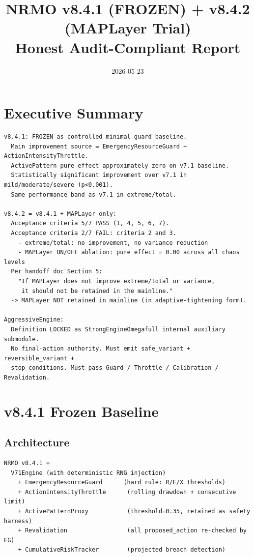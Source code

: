 \documentclass[11pt,a4paper]{article}
\title{\textbf{NRMO v8.4.1 (FROZEN) + v8.4.2 (MAPLayer Trial)}\\
       Honest Audit-Compliant Report}
\author{}
\date{2026-05-23}
\begin{document}
\maketitle

\section*{Executive Summary}

\begin{verbatim}
v8.4.1: FROZEN as controlled minimal guard baseline.
  Main improvement source = EmergencyResourceGuard + ActionIntensityThrottle.
  ActivePattern pure effect approximately zero on v7.1 baseline.
  Statistically significant improvement over v7.1 in mild/moderate/severe (p<0.001).
  Same performance band as v7.1 in extreme/total.

v8.4.2 = v8.4.1 + MAPLayer only:
  Acceptance criteria 5/7 PASS (1, 4, 5, 6, 7).
  Acceptance criteria 2/7 FAIL: criteria 2 and 3.
    - extreme/total: no improvement, no variance reduction
    - MAPLayer ON/OFF ablation: pure effect = 0.00 across all chaos levels
  Per handoff doc Section 5:
    "If MAPLayer does not improve extreme/total or variance,
     it should not be retained in the mainline."
  -> MAPLayer NOT retained in mainline (in adaptive-tightening form).

AggressiveEngine:
  Definition LOCKED as StrongEngineOmegafull internal auxiliary submodule.
  No final-action authority. Must emit safe_variant + reversible_variant +
  stop_conditions. Must pass Guard / Throttle / Calibration / Revalidation.
\end{verbatim}

\section{v8.4.1 Frozen Baseline}

\subsection{Architecture}

\begin{verbatim}
NRMO v8.4.1 =
  V71Engine (with deterministic RNG injection)
    + EmergencyResourceGuard      (hard rule: R/E/X thresholds)
    + ActionIntensityThrottle      (rolling drawdown + consecutive limit)
    + ActivePatternProxy           (threshold=0.35, retained as safety harness)
    + Revalidation                 (all proposed_action re-checked by EG)
    + CumulativeRiskTracker        (projected breach detection)
\end{verbatim}
\end{document}
